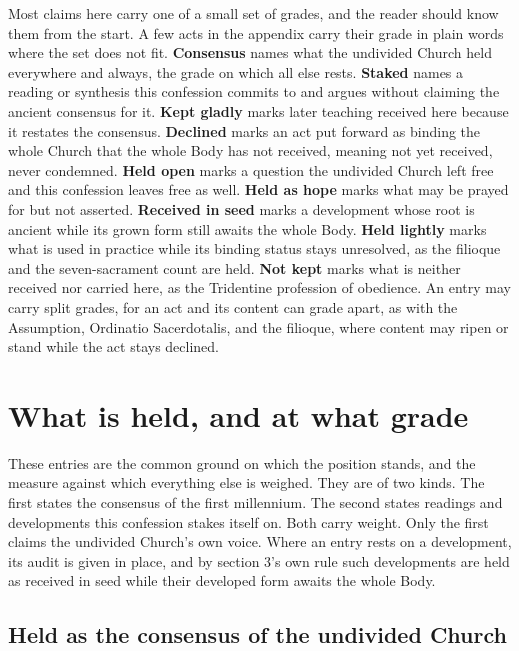 \documentclass[11pt,twoside]{article}
\newcommand{\unit}[1]{\needspace{3\baselineskip}\par\medskip{\normalfont\bfseries\color{subhead}#1}\par\nobreak\smallskip}
\begin{document}
\unit{A key to the grades used in this paper.}
Most claims here carry one of a small set of grades, and the reader should know them from the start. A few acts in the appendix carry their grade in plain words where the set does not fit. \textbf{Consensus} names what the undivided Church held everywhere and always, the grade on which all else rests. \textbf{Staked} names a reading or synthesis this confession commits to and argues without claiming the ancient consensus for it. \textbf{Kept gladly} marks later teaching received here because it restates the consensus. \textbf{Declined} marks an act put forward as binding the whole Church that the whole Body has not received, meaning not yet received, never condemned. \textbf{Held open} marks a question the undivided Church left free and this confession leaves free as well. \textbf{Held as hope} marks what may be prayed for but not asserted. \textbf{Received in seed} marks a development whose root is ancient while its grown form still awaits the whole Body. \textbf{Held lightly} marks what is used in practice while its binding status stays unresolved, as the filioque and the seven-sacrament count are held. \textbf{Not kept} marks what is neither received nor carried here, as the Tridentine profession of obedience. An entry may carry split grades, for an act and its content can grade apart, as with the Assumption, Ordinatio Sacerdotalis, and the filioque, where content may ripen or stand while the act stays declined.

\section{What is held, and at what grade}

These entries are the common ground on which the position stands, and the measure against which everything else is weighed. They are of two kinds. The first states the consensus of the first millennium. The second states readings and developments this confession stakes itself on. Both carry weight. Only the first claims the undivided Church's own voice. Where an entry rests on a development, its audit is given in place, and by section 3's own rule such developments are held as received in seed while their developed form awaits the whole Body.

\subsection*{Held as the consensus of the undivided Church}
\end{document}

